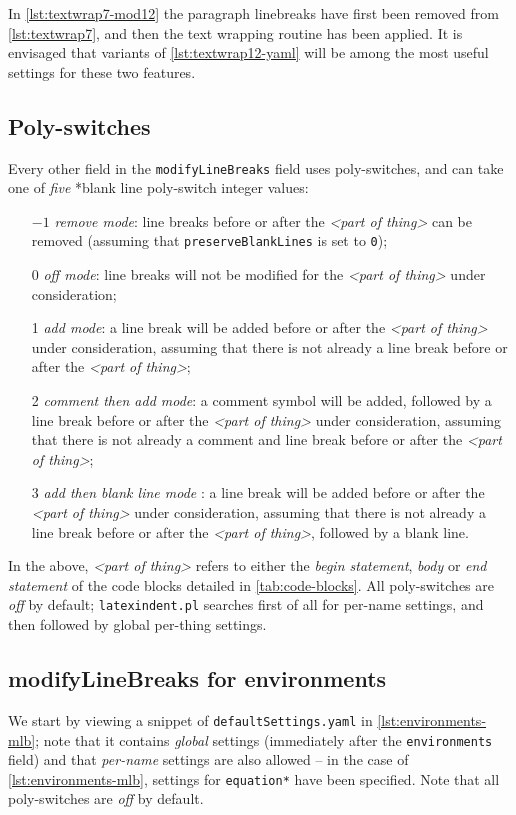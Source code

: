 	In \cref{lst:textwrap7-mod12} the paragraph linebreaks have first been removed from
	\cref{lst:textwrap7}, and  then the text wrapping routine has been applied. It is
	envisaged that variants of \cref{lst:textwrap12-yaml} will be among the most useful
	settings for these two features.

\subsection{Poly-switches}\label{sec:poly-switches}
	Every other field in the \texttt{modifyLineBreaks} field uses poly-switches, and can
	take one of \emph{five}%
	*{blank line poly-switch} integer values:
	\begin{itemize}[font=\bfseries]
		\item[$-1$] \emph{remove mode}: line breaks before or after the
		      \emph{<part of thing>} can be removed (assuming that \texttt{preserveBlankLines} is
		      set to \texttt{0});
		\item[0] \emph{off mode}: line breaks will not be modified for the
		      \emph{<part of thing>} under consideration;
		\item[1] \emph{add mode}: a line break will be added before or after the
		      \emph{<part of thing>} under consideration, assuming that
		      there is not already a line break before or after the \emph{<part of thing>};
		\item[2] \emph{comment then add mode}: a comment symbol will be added, followed by a line break
		      before or after the \emph{<part of thing>} under consideration, assuming that there
		      is not already a comment and line break before or after the \emph{<part of thing>};
		\item[3] \emph{add then blank line mode}%
		      : a line break will be added before or after the
		      \emph{<part of thing>} under consideration, assuming that
		      there is not already a line break before or after the \emph{<part of thing>},
		      followed by a blank line.
	\end{itemize}
	In the above, \emph{<part of thing>} refers to either the
	\emph{begin statement}, \emph{body} or \emph{end statement}
	of the code blocks detailed in \vref{tab:code-blocks}. All poly-switches are
	\emph{off} by default; \texttt{latexindent.pl} searches first of all
	for per-name settings, and then followed by global per-thing settings.

\subsection{modifyLineBreaks for environments}\label{sec:modifylinebreaks-environments}
	We start by viewing a snippet of \texttt{defaultSettings.yaml} in
	\cref{lst:environments-mlb}; note that it contains \emph{global} settings
	(immediately after the \texttt{environments} field) and that
	\emph{per-name} settings are also allowed -- in the case of
	\cref{lst:environments-mlb}, settings for \texttt{equation*} have been
	specified. Note that all poly-switches are \emph{off} by default.

